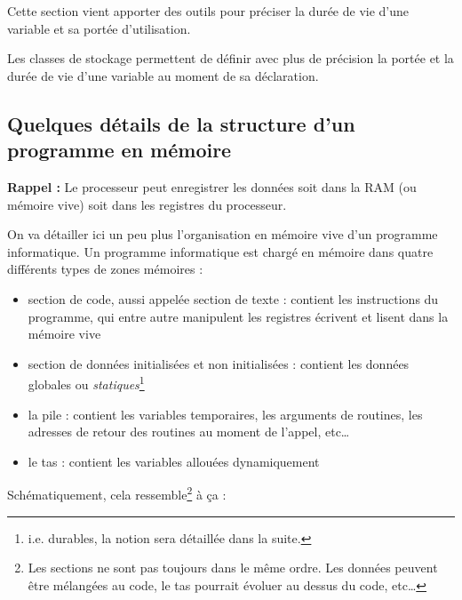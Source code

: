 \documentclass[../../../main.tex]{subfiles}
\begin{document}
Cette section vient apporter des outils pour préciser la durée de vie d'une variable et sa portée d'utilisation.

Les classes de stockage permettent de définir avec plus de précision la portée et la durée de vie d'une variable au moment de sa déclaration.
\subsection{Quelques détails de la structure d'un programme en mémoire}
\textbf{Rappel :} Le processeur peut enregistrer les données soit dans la RAM (ou mémoire vive) soit dans les registres du processeur.

On va détailler ici un peu plus l'organisation en mémoire vive d'un programme informatique. Un programme informatique est chargé en mémoire dans quatre différents types de zones mémoires :
\begin{itemize}
	\item section de code, aussi appelée section de texte : contient les instructions du programme, qui entre autre manipulent les registres écrivent et lisent dans la mémoire vive
	\item section de données initialisées et non initialisées : contient les données globales ou \textit{statiques}\footnote{i.e. durables, la notion sera détaillée dans la suite.}
	\item la pile : contient les variables temporaires, les arguments de routines, les adresses de retour des routines au moment de l'appel, etc\dots
	\item le tas : contient les variables allouées dynamiquement
\end{itemize}
Schématiquement, cela ressemble\footnote{Les sections ne sont pas toujours dans le même ordre. Les données peuvent être mélangées au code, le tas pourrait évoluer au dessus du code, etc\dots} à ça :
\end{document}
